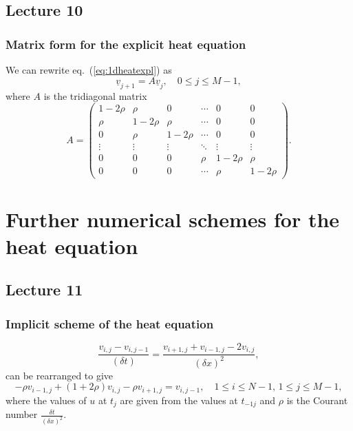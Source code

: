 \documentclass{article}
\begin{document}
\subsection{Lecture 10}
\subsubsection{Matrix form for the explicit heat equation}
We can rewrite eq.~(\ref{eq:1dheatexpl}) as 
\begin{equation}
    \underline{v}_{j+1}=A\underline{v}_j,\quad 0\leq j\leq M-1,\nonumber
\end{equation}
where $A$ is the tridiagonal matrix
\begin{equation}
    A = 
    \begin{pmatrix}
        1-2\rho & \rho & 0 & \cdots & 0 & 0 \\
        \rho & 1-2\rho & \rho & \cdots & 0 & 0 \\
        0 & \rho & 1-2\rho & \cdots & 0 & 0 \\
        \vdots & \vdots & \vdots & \ddots & \vdots & \vdots \\
        0 & 0 & 0 & \rho & 1-2\rho & \rho \\
        0 & 0 & 0 & \cdots & \rho & 1-2\rho  
    \end{pmatrix}.
\end{equation}

\section{Further numerical schemes for the heat equation}
\subsection{Lecture 11}
\subsubsection{Implicit scheme of the heat equation}
\begin{equation}
    \frac{v_{i,j}-v_{i,j-1}}{(\delta t)}=\frac{v_{i+1,j}+v_{i-1,j}-2v_{i,j}}{(\delta x)^2}\nonumber,
\end{equation}
can be rearranged to give
\begin{equation}
    -\rho v_{i-1,j}+(1+2\rho)v_{i,j}-\rho v_{i+1,j} = v_{i,j-1},\quad 1\leq i\leq N-1,\, 1\leq j \leq M-1, \label{eq:1dheatimpl}
\end{equation}
where the values of $u$ at $t_{j}$ are given from the values at $t_{-1j}$ and $\rho$ is the Courant number $\frac{\delta t}{(\delta x)^2}$.
\end{document}
